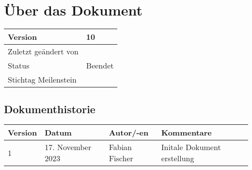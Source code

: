 \section{Über das Dokument}

\begin{table}[H]
  \begin{tabular}{|l|l|}
    \hline
   Version & 10 \\ \hline
   Zuletzt geändert von & \date{\today} \\ \hline
   Status & Beendet \\ \hline
   Stichtag Meilenstein &  \\ \hline
  \end{tabular}
\end{table}

\subsection{Dokumenthistorie}

\begin{table}[H]
  \begin{tabular}{|l|l|l|l|}
    \hline
   Version & Datum & Autor/-en & Kommentare \\ \hline
   1 & 17. November 2023 & Fabian Fischer & Initale Dokument erstellung \\ \hline
  \end{tabular}
\end{table}

